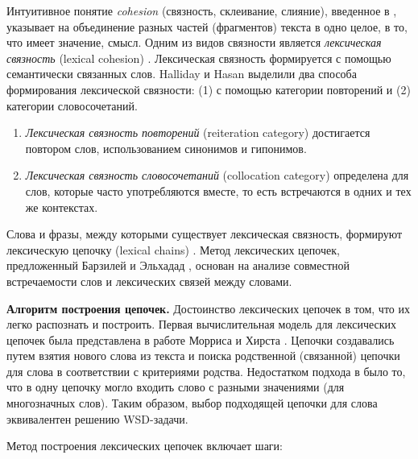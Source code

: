 \documentclass{article}
\begin{document}
\begin{articletext}
Интуитивное понятие \textit{cohesion} (связность, склеивание, слияние), введенное в \cite{Halliday Hasan 1976}, указывает на объединение разных частей (фрагментов) текста в одно целое, в то, что имеет значение, смысл. Одним из видов связности является \textit{лексическая связность} (lexical cohesion) \cite{Hoey 1991}. Лексическая связность формируется с помощью семантически связанных слов. Halliday и Hasan \cite{Halliday Hasan 1976} выделили  два способа формирования лексической связности: (1) с помощью категории повторений и (2) категории словосочетаний. 

\begin{enumerate} 
\item \textit{Лексическая связность повторений} (reiteration category) достигается повтором слов, использованием синонимов и гипонимов. 
\item \textit{Лексическая связность словосочетаний} (collocation category) определена для слов, которые часто употребляются вместе, то есть встречаются в одних и тех же контекстах.
\end{enumerate}

Слова и фразы, между которыми существует лексическая связность, формируют лексическую цепочку (lexical chains) \cite{Hoey 1991}. Метод лексических цепочек, предложенный Барзилей и Эльхадад \cite{Barzilay Elhadad 1997}, основан на анализе совместной встречаемости слов и лексических связей между словами. 

\textbf{Алгоритм построения цепочек.} Достоинство лексических цепочек в том, что их легко распознать и построить. Первая вычислительная модель для лексических цепочек была представлена в работе Морриса и Хирста \cite{Hoey 1991}. Цепочки создавались путем взятия нового слова из текста и поиска родственной (связанной) цепочки для слова в соответствии с критериями родства. Недостатком подхода в \cite{Hoey 1991} было то, что в одну цепочку могло входить слово с разными значениями (для многозначных слов). Таким образом, выбор подходящей цепочки для слова эквивалентен решению WSD-задачи.

Метод построения лексических цепочек включает шаги:


\end{articletext}
\end{document}

